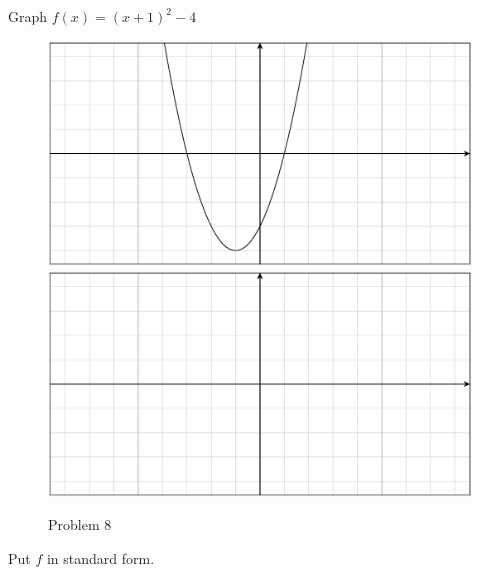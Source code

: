 \documentclass[fleqn,addpoints]{exam}
\begin{document}
\begin{questions}
  \ifprintanswers
  \else
    \pagebreak
  \fi

  \ifprintanswers
    \pagebreak
  \fi

  \question[5] Graph $f(x) = (x + 1)^2 - 4$
    \vspace{1 cm}
    \begin{figure}[H]
      \centering
      \ifprintanswers
        \includegraphics[scale=.4]{problem_8_solution.eps}
      \else
        \includegraphics[scale=.6]{problem_8_blank.eps}
      \fi
      \caption*{Problem 8}
    \end{figure}

  \ifprintanswers
  \else
    \pagebreak
  \fi

  \question Put $f$ in standard form.
    \begin{parts}
      \part[7]
        \[
          f(x) = x^2 -6x + 14
        \]

        \begin{solution}[8 cm]
          \[
            (x - 3)^2 + 5
          \]
        \end{solution}


\end{parts}
\end{questions}
\end{document}
